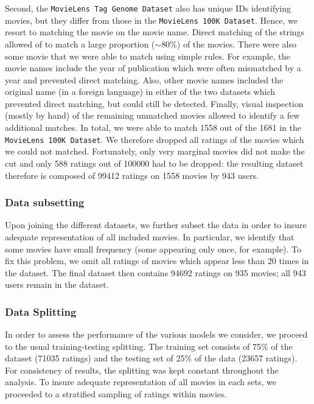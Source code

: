 \documentclass[bj, preprint]{imsart}
\begin{document}
Second, the \texttt{MovieLens Tag Genome Dataset} also has unique IDs identifying movies, but they differ from those in the \texttt{MovieLens 100K Dataset}. 
Hence, we resort to matching the movie on the movie name. 
Direct matching of the strings allowed of to match a large proportion ($\sim$80\%) of the movies. 
There were also some movie that we were able to match using simple rules. 
For example, the movie names include the year of publication which were often mismatched by a year and prevented direct matching. 
Also, other movie names included the original name (in a foreign language) in either of the two datasets which prevented direct matching, but could still be detected. 
Finally, visual inspection (mostly by hand) of the remaining unmatched movies allowed to identify a few additional matches.
In total, we were able to match \num{1558} out of the \num{1681} in the \texttt{MovieLens 100K Dataset}. 
We therefore dropped all ratings of the movies which we could not matched. Fortunately, only very marginal movies did not make the cut and only \num{588} ratings out of \num{100000} had to be dropped: the resulting dataset therefore is composed of \num{99412} ratings on \num{1558} movies by \num{943} users. 

\subsubsection{Data subsetting}\label{subsubsec:method.preprocess.subset}

Upon joining the different datasets, we further subset the data in order to insure adequate representation of all included movies. 
In particular, we identify that some movies have small frequency (some appearing only once, for example). 
To fix this problem, we omit all ratings of movies which appear less than 20 times in the dataset. 
The final dataset then contains \num{94692} ratings on \num{935} movies; all \num{943} users remain in the dataset.

\subsubsection{Data Splitting}\label{subsubsec:method.preprocess.split}

In order to assess the performance of the various models we consider, we proceed to the usual training-testing splitting. 
The training set consists of 75\% of the dataset (\num{71035} ratings) and the testing set of 25\% of the data (\num{23657} ratings). 
For consistency of results, the splitting was kept constant throughout the analysis.
To insure adequate representation of all movies in each sets, we proceeded to a stratified sampling of ratings within movies.
\end{document}
